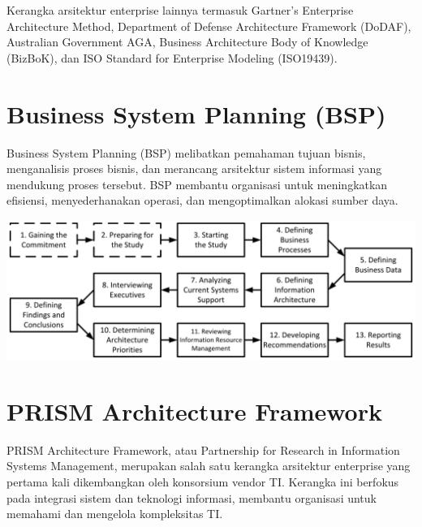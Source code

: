 Kerangka arsitektur enterprise lainnya termasuk Gartner's Enterprise Architecture Method, Department of Defense Architecture Framework (DoDAF), Australian Government AGA, Business Architecture Body of Knowledge (BizBoK), dan ISO Standard for Enterprise Modeling (ISO19439).

\section{Business System Planning (BSP)}
Business System Planning (BSP) melibatkan pemahaman tujuan bisnis, menganalisis proses bisnis, dan merancang arsitektur sistem informasi yang mendukung proses tersebut. BSP membantu organisasi untuk meningkatkan efisiensi, menyederhanakan operasi, dan mengoptimalkan alokasi sumber daya.

\begin{center}
	\includegraphics[width=\textwidth]{../figures/bsp}
\end{center}

\section{PRISM Architecture Framework}
PRISM Architecture Framework, atau Partnership for Research in Information Systems Management, merupakan salah satu kerangka arsitektur enterprise yang pertama kali dikembangkan oleh konsorsium vendor TI. Kerangka ini berfokus pada integrasi sistem dan teknologi informasi, membantu organisasi untuk memahami dan mengelola kompleksitas TI.

